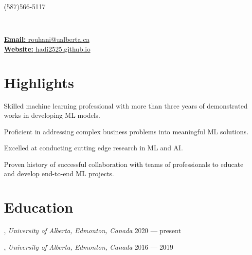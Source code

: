 \documentclass[letter,11pt]{article}
\author{Mohammad Hadi Rouhani} %
\makeatletter
\def\phone{(587)566-5117}
\def\city{}
\def\email{rouhani@ualberta.ca}
\def\Web{hadi2525.github.io}
\def\role{} %
\makeatother
\begin{document}
\begin{center}
	\begin{minipage}[b]{.3\textwidth}
		\raggedright
		{\large \phone} \\ %
		{\city} %
		
	\end{minipage}%
	\begin{minipage}[b]{.4\textwidth}
		\makeatletter
		\centering {\HUGE \@author} \\
		\makeatother
		\vspace{.5em}
		{\color{highlight} \Large{\role}}
	\end{minipage}%
	\begin{minipage}[b]{.3\textwidth}
		\raggedleft 
		\href{mailto:\email}{\textbf{Email:} \email}\\ 
		\href{https://hadi2525.github.io/\Web}{\textbf{Website:} \Web}
	\end{minipage}

\end{center}
\vspace{-1em}	
\section{Highlights}
\begin{zitemize}
	\item Skilled machine learning professional with more than three years of demonstrated works in developing ML models.
	\item Proficient in addressing complex business problems into meaningful ML solutions.
	\item Excelled at conducting cutting edge research in ML and AI.
	\item Proven history of successful collaboration with teams of professionals to educate and develop end-to-end ML projects.
\end{zitemize}
\section{Education}
, \textit{University of Alberta, Edmonton, Canada}	\hfill  2020 --- present

,  \textit{University of Alberta, Edmonton, Canada}	\hfill  2016 --- 2019
\end{document}

